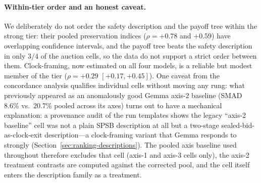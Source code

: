 \paragraph{Within-tier order and an honest caveat.}
We deliberately do not order the safety description and the payoff tree within
the strong tier: their pooled preservation indices ($\rho = +0.78$ and
$+0.59$) have overlapping confidence intervals, and the payoff tree beats the
safety description in only $3/4$ of the auction cells, so the data do not
support a strict order between them. Clock-framing, now estimated on
all four models, is a reliable but modest member of the tier
($\rho = +0.29$ $[+0.17, +0.45]$). One caveat from the concordance
analysis qualifies individual cells without moving any rung: what
previously appeared as an anomalously good Gemma axis-2 baseline (SMAD
$8.6\%$ vs.\ $20.7\%$ pooled across its axes) turns out to have a mechanical
explanation: a provenance audit of the run templates shows the legacy
``axis-2 baseline'' cell was not a plain SPSB description at all but a
two-stage sealed-bid-as-clock-exit description---a clock-framing variant
that Gemma responds to strongly (Section~\ref{sec:ranking-descriptions}).
The pooled axis baseline used throughout therefore excludes that cell
(axis-1 and axis-3 cells only), the axis-2 treatment contrasts are computed
against the corrected pool, and the cell itself enters the description
family as a treatment.
